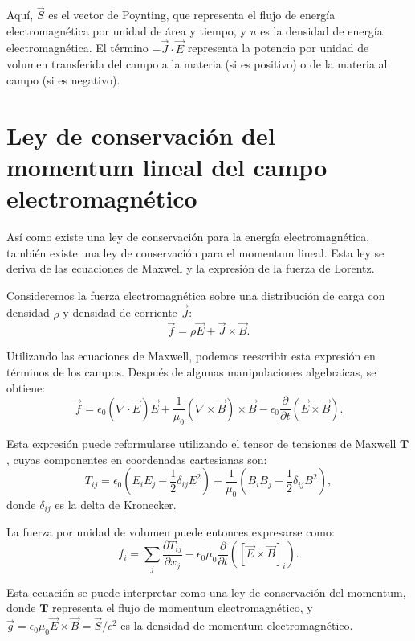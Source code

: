 \documentclass[12pt,a4paper]{book}
\begin{document}
Aquí, $\vec{S}$ es el vector de Poynting, que representa el flujo de energía electromagnética por unidad de área y tiempo, y $u$ es la densidad de energía electromagnética. El término $-\vec{J} \cdot \vec{E}$ representa la potencia por unidad de volumen transferida del campo a la materia (si es positivo) o de la materia al campo (si es negativo).
\section{Ley de conservación del momentum lineal del campo electromagnético}

Así como existe una ley de conservación para la energía electromagnética, también existe una ley de conservación para el momentum lineal. Esta ley se deriva de las ecuaciones de Maxwell y la expresión de la fuerza de Lorentz.

Consideremos la fuerza electromagnética sobre una distribución de carga con densidad $\rho$ y densidad de corriente $\vec{J}$:
\begin{equation}
\vec{f} = \rho \vec{E} + \vec{J} \times \vec{B}.
\end{equation}

Utilizando las ecuaciones de Maxwell, podemos reescribir esta expresión en términos de los campos. Después de algunas manipulaciones algebraicas, se obtiene:
\begin{equation}
\vec{f} = \epsilon_0 (\nabla \cdot \vec{E})\vec{E} + \frac{1}{\mu_0}(\nabla \times \vec{B}) \times \vec{B} - \epsilon_0 \frac{\partial}{\partial t}(\vec{E} \times \vec{B}).
\end{equation}

Esta expresión puede reformularse utilizando el tensor de tensiones de Maxwell $\mathbf{T}$, cuyas componentes en coordenadas cartesianas son:
\begin{equation}
T_{ij} = \epsilon_0 \left(E_i E_j - \frac{1}{2}\delta_{ij}E^2\right) + \frac{1}{\mu_0}\left(B_i B_j - \frac{1}{2}\delta_{ij}B^2\right),
\end{equation}
donde $\delta_{ij}$ es la delta de Kronecker.

La fuerza por unidad de volumen puede entonces expresarse como:
\begin{equation}
f_i = \sum_j \frac{\partial T_{ij}}{\partial x_j} - \epsilon_0 \mu_0 \frac{\partial}{\partial t}([\vec{E} \times \vec{B}]_i).
\end{equation}

Esta ecuación se puede interpretar como una ley de conservación del momentum, donde $\mathbf{T}$ representa el flujo de momentum electromagnético, y $\vec{g} = \epsilon_0 \mu_0 \vec{E} \times \vec{B} = \vec{S}/c^2$ es la densidad de momentum electromagnético.
\end{document}
